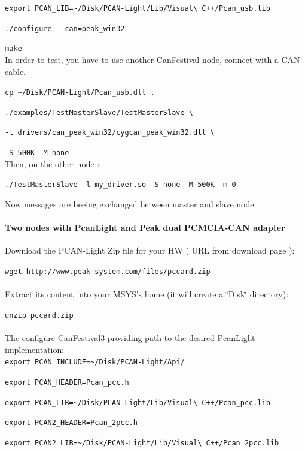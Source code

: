 \documentclass[a4paper,12pt]{book}
\begin{document}
\texttt{export PCAN\_LIB=\~{ }/Disk/PCAN-Light/Lib/Visual\textbackslash{}
C++/Pcan\_usb.lib}

\texttt{./configure -{}-can=peak\_win32}

\texttt{make}~\\


In order to test, you have to use another CanFestival node, connect
with a CAN cable.

\texttt{cp \~{ }/Disk/PCAN-Light/Pcan\_usb.dll .}

\texttt{./examples/TestMasterSlave/TestMasterSlave \textbackslash{}}

\texttt{-l drivers/can\_peak\_win32/cygcan\_peak\_win32.dll \textbackslash{}}

\texttt{-S 500K -M none}~\\


Then, on the other node :

\texttt{./TestMasterSlave -l my\_driver.so -S none -M 500K -m 0}

Now messages are beeing exchanged between master and slave node.


\paragraph{Two nodes with PcanLight and Peak dual PCMCIA-CAN adapter}

Download the PCAN-Light Zip file for your HW ( URL from download page
):

\texttt{wget http://www.peak-system.com/files/pccard.zip}~\\
\\
Extract its content into your MSYS's home (it will create a \char`\"{}Disk\char`\"{}
directory):

\texttt{unzip pccard.zip}~\\
\\
The configure CanFestival3 providing path to the desired PcanLight
implementation:\\


\texttt{export PCAN\_INCLUDE=\~{ }/Disk/PCAN-Light/Api/}

\texttt{export PCAN\_HEADER=Pcan\_pcc.h}

\texttt{export PCAN\_LIB=\~{ }/Disk/PCAN-Light/Lib/Visual\textbackslash{}
C++/Pcan\_pcc.lib}

\texttt{export PCAN2\_HEADER=Pcan\_2pcc.h}

\texttt{export PCAN2\_LIB=\~{ }/Disk/PCAN-Light/Lib/Visual\textbackslash{}
C++/Pcan\_2pcc.lib}~\\
\end{document}
